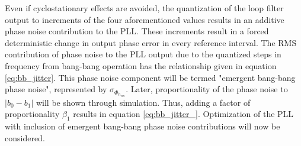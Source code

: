 	Even if cyclostationary effects are avoided, the quantization of the loop filter output to increments of the four aforementioned values results in an additive phase noise contribution to the PLL. These increments result in a forced deterministic change in output phase error in every reference interval. The RMS contribution of phase noise to the PLL output due to the quantized steps in frequency from bang-bang operation  has the relationship given in equation \ref{eq:bb_jitter}. This phase noise component will be termed "emergent bang-bang phase noise", represented by $\sigma_{\Phi_{n_{em}}}$. Later, proportionality of the phase noise to $|b_0-b_1|$ will be shown through simulation. Thus, adding a factor of proportionality $\beta_1$ results in equation \ref{eq:bb_jitter_}. Optimization of the PLL with inclusion of emergent bang-bang phase noise contributions will now be considered. 

